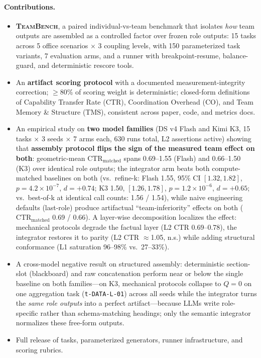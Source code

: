 \documentclass[sigconf,anonymous]{aamas}
\newcommand{\teambench}{\textsc{TeamBench}}
\newcommand{\ctrm}{\mathrm{CTR}_{\text{matched}}}
\newcommand{\code}[1]{\texttt{#1}}
\begin{document}
\paragraph{Contributions.}
\begin{itemize}
\item \textbf{\teambench{}}, a paired individual-vs-team benchmark that isolates \emph{how} team outputs are assembled as a controlled factor over frozen role outputs: 15 tasks across 5 office scenarios $\times$ 3 coupling levels, with 150 parameterized task variants, 7 evaluation arms, and a runner with breakpoint-resume, balance-guard, and deterministic rescore tools.
\item An \textbf{artifact scoring protocol} with a documented measurement-integrity correction; $\ge$80\% of scoring weight is deterministic; closed-form definitions of Capability Transfer Rate (CTR), Coordination Overhead (CO), and Team Memory \& Structure (TMS), consistent across paper, code, and metrics docs.
\item An empirical study on \textbf{two model families} (DS v4 Flash and Kimi K3, 15 tasks $\times$ 3 seeds $\times$ 7 arms each, 630 runs total, L2 assertions active) showing that \textbf{assembly protocol flips the sign of the measured team effect on both}: geometric-mean $\ctrm$ spans 0.69--1.55 (Flash) and 0.66--1.50 (K3) over identical role outputs; the integrator arm beats both compute-matched baselines on both (vs.\ refine-k: Flash 1.55, 95\% CI $[1.32,1.82]$, $p=4.2\times10^{-7}$, $d=+0.74$; K3 1.50, $[1.26,1.78]$, $p=1.2\times10^{-6}$, $d=+0.65$; vs.\ best-of-k at identical call counts: 1.56 / 1.54), while naive engineering defaults (last-role) produce artifactual ``team-inferiority'' effects on both ($\ctrm$ 0.69 / 0.66). A layer-wise decomposition localizes the effect: mechanical protocols degrade the factual layer (L2 CTR 0.69--0.78), the integrator restores it to parity (L2 CTR $\approx$1.05, n.s.) while adding structural conformance (L1 saturation 96--98\% vs.\ 27--33\%).
\item A cross-model negative result on structured assembly: deterministic section-slot (blackboard) and raw concatenation perform near or below the single baseline on both families---on K3, mechanical protocols collapse to $Q=0$ on one aggregation task (\code{t-DATA-L-01}) across all seeds while the integrator turns the \emph{same role outputs} into a perfect artifact---because LLMs write role-specific rather than schema-matching headings; only the semantic integrator normalizes these free-form outputs.
\item Full release of tasks, parameterized generators, runner infrastructure, and scoring rubrics.
\end{itemize}
\end{document}
